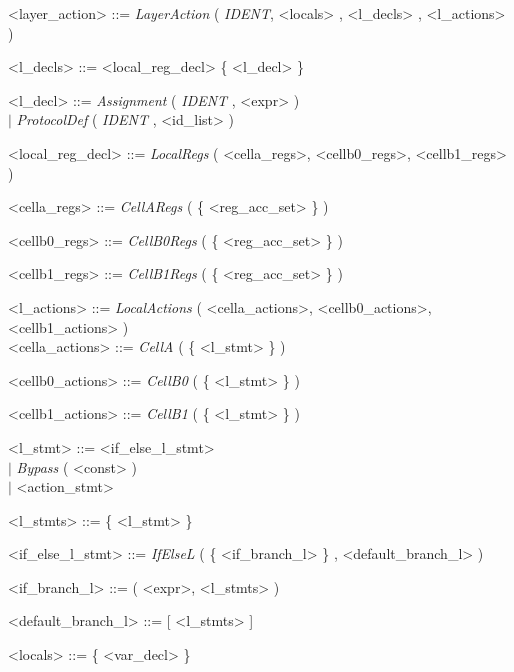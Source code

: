 \documentclass{article}
\begin{document}
\begin{grammar} \small

{\renewcommand\baselinestretch{0}\selectfont
<layer\_action>   ::= \textit{LayerAction} ( \emph{IDENT}, <locals> , <l\_decls> , <l\_actions> )

<l\_decls>     ::=   <local\_reg\_decl> \{ <l\_decl>  \}

<l\_decl>     ::=   \textit{Assignment} ( \emph{IDENT} , <expr> ) \\
     \hspace*{0.8cm} $\mid$  \textit{ProtocolDef} ( \emph{IDENT} , <id\_list> )

<local\_reg\_decl>     ::=  \textit{LocalRegs} ( <cella\_regs>, <cellb0\_regs>, <cellb1\_regs> )

<cella\_regs>     ::=    \textit{CellARegs} ( \{ <reg\_acc\_set> \} )

<cellb0\_regs>     ::=   \textit{CellB0Regs} ( \{ <reg\_acc\_set> \} )

<cellb1\_regs>     ::=   \textit{CellB1Regs} ( \{ <reg\_acc\_set> \} )

<l\_actions>     ::=   \textit{LocalActions} ( <cella\_actions>, <cellb0\_actions>, <cellb1\_actions> ) \\

<cella\_actions>     ::=    \textit{CellA} ( \{ <l\_stmt> \} )

<cellb0\_actions>     ::=    \textit{CellB0} ( \{ <l\_stmt> \} )

<cellb1\_actions>     ::=    \textit{CellB1} ( \{ <l\_stmt> \} )

<l\_stmt>     ::=   <if\_else\_l\_stmt> \\
     \hspace*{0.88cm} $\mid$  \textit{Bypass} ( <const> ) \\
     \hspace*{0.88cm} $\mid$  <action\_stmt>

<l\_stmts>     ::=   \{ <l\_stmt>  \}

<if\_else\_l\_stmt>     ::=   \textit{IfElseL} ( \{ <if\_branch\_l>  \} , <default\_branch\_l> )

<if\_branch\_l>     ::=   ( <expr>, <l\_stmts> )

<default\_branch\_l>     ::=  [ <l\_stmts> ]

\par}


{\renewcommand\baselinestretch{0}\selectfont

<locals>   ::=  \{ <var\_decl> \}


}
\end{grammar}
\end{document}
